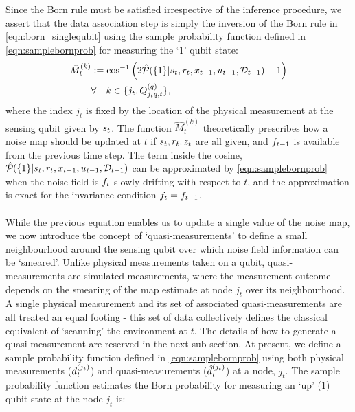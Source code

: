 Since the Born rule must be satisfied irrespective of the inference procedure, we assert that the data association step is simply the inversion of the Born rule in \cref{eqn:born_singlequbit} using the sample probability function defined in \cref{eqn:samplebornprob} for measuring the `1' qubit state:
\begin{align}
\hat{M}_t^{(k)} &:= \cos^{-1}\left( 2\hat{\mathcal{P}}_{} (\{1\} | s_{ t}, r_{ t}, x_{t-1}, u_{t-1}, \mathcal{D}_{t-1}) - 1 \right) \label{eqn:mapdatassoc:2} \\
& \forall \quad  k \in \{j_t, Q^{( q )}_{j_t q, t } \}, \nonumber 
\end{align} where the index $j_t$  is fixed by the location of the physical measurement at the sensing qubit  given by $s_{ t}$. The function  $\hat{M}_t^{(k)}$ theoretically prescribes how a noise map should be updated at $t$ if $s_{ t}, r_{ t}, z_t$ are all given, and $f_{ t-1}$ is available from the previous time step. The term inside the cosine, $\hat{\mathcal{P}}_{} (\{1\} | s_{ t}, r_{ t}, x_{t-1}, u_{t-1}, \mathcal{D}_{t-1})$ can be approximated by \cref{eqn:samplebornprob} when the noise field is $f_{ t}$ slowly drifting with respect to $t$, and the approximation is exact for the invariance condition $f_{ t} = f_{ t-1}$.\\
\\
While the previous equation enables us to update a single value of the noise map, we now introduce the concept of `quasi-measurements' to define a small neighbourhood around the sensing qubit over which noise field information can be `smeared'. Unlike physical measurements taken on a qubit, quasi-measurements are simulated measurements, where the measurement outcome depends on the smearing of the map estimate at node $j_t$ over its neighbourhood. A single physical measurement and its set of associated quasi-measurements are all treated an equal footing - this set of data collectively defines the classical equivalent of `scanning' the environment at $t$. The details of how to generate a quasi-measurement are reserved in the next sub-section. At present, we define  a sample probability function defined in \cref{eqn:samplebornprob} using both physical measurements ($d^{( j_t )}_{t}$) and quasi-measurements ($\hat{d}^{( j_t )}_{t}$) at a node, $j_t$. The sample probability function estimates the Born probability for measuring an `up' ($1$) qubit state at the node $j_t$ is:
